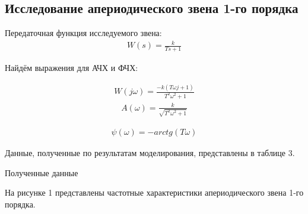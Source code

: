\documentclass[a4paper, 11pt]{article}
\begin{document}
\newpage
\begin{center}
	\section{Исследование апериодического звена 1-го порядка}
\end{center}

\par 
Передаточная функция исследуемого звена:
\begin{align}
	W(s)=\frac{k}{Ts+1}
\end{align}
\par 
Найдём выражения для АЧХ и ФЧХ:

\begin{align}
	W(j\omega)=\frac{-k(T\omega j+1)}{T^2\omega^2+1}
\end{align}
\begin{align}
	A(\omega)=\frac{k}{\sqrt{T^2\omega^2+1}}
\end{align}
	
\begin{align}
	\psi(\omega)=-arctg(T\omega)
\end{align}

\newpage
\par 
Данные, полученные по результатам моделирования, представлены в таблице 3.
\begin{table}[h!]
    \begin{threeparttable}
        \caption{Полученные данные} \label{tab:perflogcross}
    \end{threeparttable}
\end{table}

\newpage
\par 
На рисунке 1 представлены частотные характеристики апериодического звена 1-го порядка.
\end{document}
